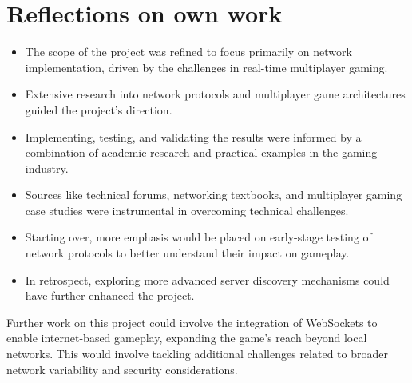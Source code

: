 \section{Reflections on own work}
\label{chap:reflection}
\begin{itemize}
    \item The scope of the project was refined to focus primarily on network implementation, driven by the challenges in real-time multiplayer gaming.
    \item Extensive research into network protocols and multiplayer game architectures guided the project's direction.
    \item Implementing, testing, and validating the results were informed by a combination of academic research and practical examples in the gaming industry.
    \item Sources like technical forums, networking textbooks, and multiplayer gaming case studies were instrumental in overcoming technical challenges.
    \item Starting over, more emphasis would be placed on early-stage testing of network protocols to better understand their impact on gameplay.
    \item In retrospect, exploring more advanced server discovery mechanisms could have further enhanced the project.
\end{itemize}

\newpage

Further work on this project could involve the integration of WebSockets to enable internet-based gameplay, expanding the game's reach beyond local networks. This would involve tackling additional challenges related to broader network variability and security considerations.